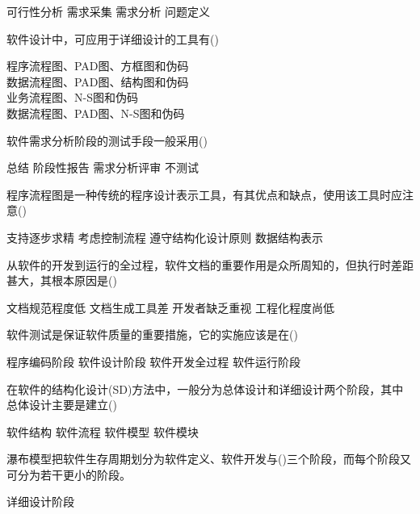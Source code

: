 \documentclass[answers]{exam}
\begin{document}
\begin{questions}
\begin{oneparchoices}
		\choice 可行性分析
		\choice 需求采集
		\choice 需求分析
		\correctchoice 问题定义
	\end{oneparchoices}
	\question 软件设计中，可应用于详细设计的工具有()\\
	\begin{oneparchoices}
		\correctchoice 程序流程图、PAD图、方框图和伪码\\
		\choice 数据流程图、PAD图、结构图和伪码\\
		\choice 业务流程图、N-S图和伪码\\
		\choice 数据流程图、PAD图、N-S图和伪码
	\end{oneparchoices}
	\question 软件需求分析阶段的测试手段一般采用()\\
	\begin{oneparchoices}
		\choice 总结
		\choice 阶段性报告
		\correctchoice 需求分析评审
		\choice 不测试
	\end{oneparchoices}
	\question 程序流程图是一种传统的程序设计表示工具，有其优点和缺点，使用该工具时应注意()\\
	\begin{oneparchoices}
		\choice 支持逐步求精
		\choice 考虑控制流程
		\correctchoice 遵守结构化设计原则
		\choice 数据结构表示
	\end{oneparchoices}
	\question 从软件的开发到运行的全过程，软件文档的重要作用是众所周知的，但执行时差距甚大，其根本原因是()\\
	\begin{oneparchoices}
		\choice 文档规范程度低
		\choice 文档生成工具差
		\choice 开发者缺乏重视
		\correctchoice 工程化程度尚低
	\end{oneparchoices}
	\question 软件测试是保证软件质量的重要措施，它的实施应该是在()\\
	\begin{oneparchoices}
		\choice 程序编码阶段
		\choice 软件设计阶段
		\correctchoice 软件开发全过程
		\choice 软件运行阶段
	\end{oneparchoices}
	\question 在软件的结构化设计(SD)方法中，一般分为总体设计和详细设计两个阶段，其中总体设计主要是建立()\\
	\begin{oneparchoices}
		\correctchoice 软件结构
		\choice 软件流程
		\choice 软件模型
		\choice 软件模块
	\end{oneparchoices}
	\question 瀑布模型把软件生存周期划分为软件定义、软件开发与()三个阶段，而每个阶段又可分为若干更小的阶段。\\
	\begin{oneparchoices}
		\choice 详细设计阶段

\end{oneparchoices}
\end{questions}
\end{document}
